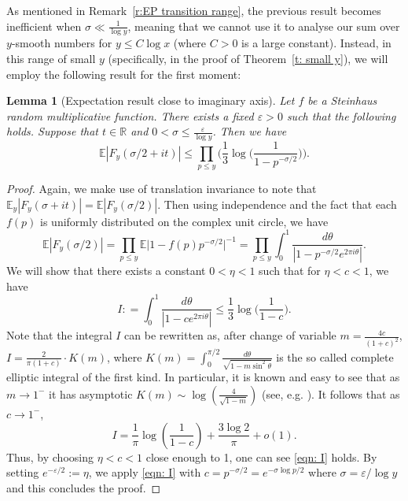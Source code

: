 \documentclass[12pt,a4paper,reqno]{amsart}
\numberwithin{equation}{section}
\def\R{\mathbb R}
\def\E{\mathbb E}
\def\ee{\varepsilon}
\def\leq {\leqslant}
\newtheorem{lemma}[theorem]{Lemma}
\theoremstyle{remark}
\theoremstyle{definition}
\numberwithin{equation}{section}
\theoremstyle{remark}
\def\E{\mathbb E}
\begin{document}
As mentioned in Remark~\ref{r:EP transition range}, the previous result becomes inefficient when $\sigma \ll \frac{1}{\log y}$, meaning that we cannot use it to analyse our sum over $y$-smooth numbers for $y \leq C \log x$ (where $C>0$ is a large constant). Instead, in this range of small $y$ (specifically, in the proof of Theorem~\ref{t: small y}), we will employ the following result for the first moment:

\begin{lemma}[Expectation result close to imaginary axis]\label{l:exp for small y}
Let $f$ be a Steinhaus random multiplicative function. There exists a fixed $\ee>0$ such that the following holds. Suppose that $t \in \R$ and $0 < \sigma \leq \frac{\varepsilon}{\log y}$. Then we have
\[
\E |F_y (\sigma / 2 + it)| \leq \prod_{p \leq y} \biggl( \frac{1}{3}\log\Big(\frac{1}{1-p^{-\sigma/2}}\Big) \biggr).
\]
\end{lemma}
\begin{proof}
Again, we make use of translation invariance to note that $\E_y |F_y (\sigma + it)| = \E |F_y (\sigma/2)|$. Then using independence and the fact that each $f(p)$ is uniformly distributed on the complex unit circle, we have
\[
\E |F_y (\sigma / 2)| = \prod_{p \leq y} \E \bigl| 1 - f(p) p^{- \sigma/2} \bigr|^{-1} = \prod_{p \leq y} \int_{0}^{1} \frac{d \theta}{| 1 - p^{- \sigma/2} e^{2 \pi i \theta}|}.
\]
We will show that there exists a constant $0< \eta< 1$ such that for $\eta < c < 1$, we have 
\begin{equation}\label{eqn: I}
   I: = 
\int_{0}^{1} \frac{d \theta}{| 1 - c e^{2 \pi i \theta}|} \leq \frac{1}{3} \log \biggl( \frac{1}{1-c} \biggr) .
\end{equation} Note that the integral $I$ can be rewritten as, after change of variable $m = \frac{4c}{(1+c)^{2}}$,
$I  = \frac{2}{\pi (1+c) } \cdot K(m)$, 
where $K(m) = \int_{0}^{\pi/2} \frac{d\theta}{\sqrt{1-m\sin^{2}\theta}}$ is the so called complete elliptic integral of the first kind. In particular, it is known and easy to see that as $m \to 1^{-}$ it has asymptotic $K(m)\sim \log (\frac{4}{\sqrt{1-m}})$ (see, e.g. \cite{Elliptic}).
 It follows that as $c \to 1^{-}$,  
\[I = \frac{1}{\pi } \log (\frac{1}{1-c}) + \frac{3\log 2}{\pi} + o(1).  \]
Thus, by choosing $\eta< c<1$ close enough to 1, one can see \eqref{eqn: I} holds.   
By setting $e^{-\ee/2} := \eta$, we apply \eqref{eqn: I} with $c= p^{-\sigma/2} = e^{-\sigma \log p /2}$ where $\sigma = \ee/\log y$ and this concludes the proof. 
\end{proof}
\end{document}
